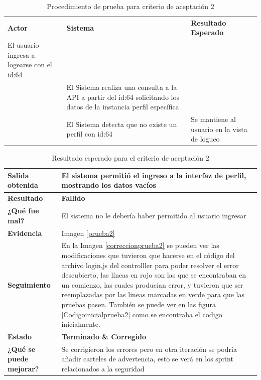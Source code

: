     {\scriptsize
        \begin{table}[h]
        \centering
	\begin{longtable}{|p{4cm}|p{6cm}|p{5cm}|}
	    \hline  \hline \rowcolor[gray]{0.9} 
        \multicolumn{3}{||l|}{\textbf{Procedimiento de Prueba - ``Consultar perfil de usuario NO existente''}} \\
        \hline \rowcolor[gray]{0.9}
	    \textbf{Actor} & \textbf{Sistema}&\textbf{Resultado Esperado} \\  \hline
	   El usuario ingresa a logearse con el id:64 & & \\ \hline
        & El Sistema realiza una consulta a la API a partir del id:64 solicitando los datos de la instancia perfil específica &   \\ \hline
        &El Sistema detecta que no existe un perfil con id:64&  Se mantiene al usuario en la vista de logueo\\ \hline
	    \end{longtable}
        \caption{Procedimiento de prueba para criterio de aceptación 2}
        
    	\end{table}
    }
    
    {\scriptsize
	\begin{table}[h]
	\centering
	\begin{longtable}{|l|p{10cm}|}
	    \hline 
	    \textbf{Salida obtenida}&El sistema permitió el ingreso a la interfaz de perfil, mostrando los datos vacíos\\ \hline
	    \textbf{Resultado}& \textbf{Fallido} \\ \hline
        \textbf{¿Qué fue mal?}& El sistema no le debería haber permitido al usuario ingresar\\ \hline      
        \textbf{Evidencia}& Imagen \ref{prueba2} \\ \hline
        \textbf{Seguimiento}&  En la Imagen \ref{correccionprueba2} se pueden ver las modificaciones que tuvieron que hacerse en el código del archivo login.js del controlller para poder resolver el error descubierto, las líneas en rojo son las que se encontraban en un comienzo, las cuales producían error, y tuvieron que ser reemplazadas por las lineas marcadas en verde para que las pruebas pasen. También se puede ver en las figura \ref{Codigoinicialprueba2} como se encontraba el codigo inicialmente.\\ \hline
        \textbf{Estado}& \textbf{Terminado \& Corregido}\\ \hline        
        \textbf{¿Qué se puede mejorar?}& Se corrigieron los errores pero en otra iteración se podría añadir carteles de advertencia, esto se verá en los sprint relacionados a la seguridad\\ \hline              
     
	    \end{longtable}
        \caption{Resultado esperado para el criterio de aceptación 2}
    	\end{table}
	}
    
